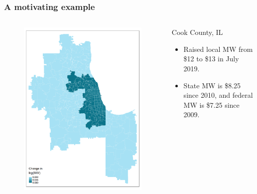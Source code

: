 \documentclass[aspectratio=169, t]{beamer}
\begin{document}
\begin{frame}
	\frametitle{A motivating example}
    \begin{columns}
        \begin{column}{0.44\textwidth}
            \vspace{-8mm}
            \begin{figure}
                \centering
                \includegraphics[scale = 0.38]{maps_events/output/chicago_2019-6_actual_mw.png}
            \end{figure}   
        \end{column}
        \begin{column}{0.56\textwidth}
			Cook County, IL
            \begin{itemize}
                \item Raised local MW from \$12 to \$13 in July 2019. 
				\item State MW is \$8.25 since 2010, and federal MW is \$7.25 since 2009.

\end{itemize}
\end{column}
\end{columns}
\end{frame}
\end{document}
